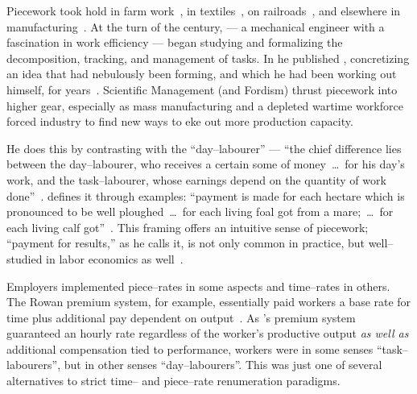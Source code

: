 \documentclass[trackingWork]{subfiles}
\begin{document}
Piecework took hold in farm work~\cite{hughRaynbirdTaskWork},
in textiles~\cite{restructuringPieceworkBaker,riisOtherSideLives},
on railroads~\cite{Brown01041990}, and 
elsewhere in manufacturing~\cite{10.2307/3827491}.
At the turn of the  century, \citeauthor{taylor1914principles}
--- a mechanical engineer with a fascination in work efficiency ---
began studying and formalizing the decomposition, tracking, and management of tasks.
In \citeyear{taylor1914principles} he published ,
concretizing an idea that had nebulously been forming,
and which he had been working out himself, for years~\cite{taylor1914principles}.
Scientific Management (and Fordism) thrust piecework into higher gear, especially as
mass manufacturing and
a depleted wartime workforce forced industry to find new ways to eke out more production capacity.


He does this by contrasting with the ``day--labourer'' ---
``the chief difference lies between the day--labourer,
who receives a certain some of money~\dots~for his day's work,
and the task--labourer, whose earnings depend on the quantity of work done''~\cite{hughRaynbirdTaskWork}.
\citeauthor{10.2307/2338394} defines it through examples:
``payment is made for each hectare which is pronounced to be well ploughed~\dots~for each living foal got from a mare;~\dots~for each living calf got''~\cite{10.2307/2338394}.
This framing offers an intuitive sense of piecework;
``payment for results,'' as he calls it,
is not only common in practice, but
well--studied in labor economics as well~\cite{Figlio2007901,weitzman1976new,10.2307/3003414,BJIR:BJIR038}.

Employers implemented piece--rates in some aspects and
time--rates in others.
The Rowan premium system, for example,
essentially paid workers
a base rate for time plus
additional pay dependent on output~\cite{rowan1901premium}.
As \citeauthor{rowan1901premium}'s premium system guaranteed an hourly rate
regardless of the worker's productive output
\textit{as well as} additional compensation tied to performance,
workers were
in some senses ``task--labourers'', but
in other senses ``day--labourers''.
This was just one of several alternatives to strict time-- and piece--rate renumeration paradigms.
\end{document}
